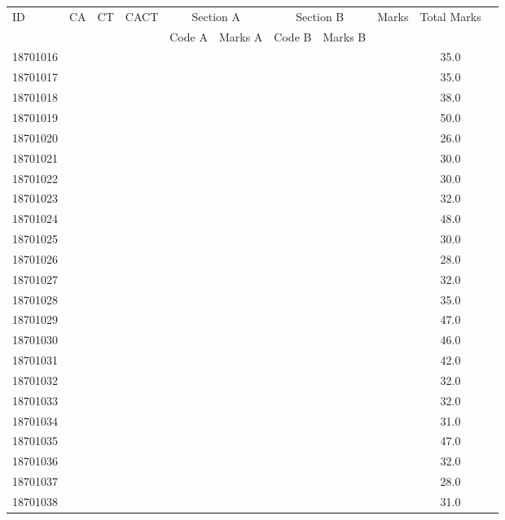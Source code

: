 \documentclass[12pt]{article}
\begin{document}
    \begin{center} 
	\renewcommand{\arraystretch}{1.08}
	\begin{small}
    \begin{tabular}{|l|c|c|c|c|c|c|c|c|c|c|} \hline
	\multirow{2}{*}{ID} & 	\multirow{2}{*}{CA}  & 	\multirow{2}{*}{CT}  & 	\multirow{2}{*}{CACT}  & \multicolumn{2 }{c|}{Section A}& \multicolumn{2 }{c|}{Section B} & 	\multirow{2}{*}{Marks}  & 	\multirow{2}{*}{Total Marks}  \\ 
	&  &  &  & Code A & Marks A & Code B & Marks B&  &  \\ \hline
18701016 &  &  &  &  &  &  &  &  & 35.0\\ \hline 
18701017 &  &  &  &  &  &  &  &  & 35.0\\ \hline 
18701018 &  &  &  &  &  &  &  &  & 38.0\\ \hline 
18701019 &  &  &  &  &  &  &  &  & 50.0\\ \hline 
18701020 &  &  &  &  &  &  &  &  & 26.0\\ \hline 
18701021 &  &  &  &  &  &  &  &  & 30.0\\ \hline 
18701022 &  &  &  &  &  &  &  &  & 30.0\\ \hline 
18701023 &  &  &  &  &  &  &  &  & 32.0\\ \hline 
18701024 &  &  &  &  &  &  &  &  & 48.0\\ \hline 
18701025 &  &  &  &  &  &  &  &  & 30.0\\ \hline 
18701026 &  &  &  &  &  &  &  &  & 28.0\\ \hline 
18701027 &  &  &  &  &  &  &  &  & 32.0\\ \hline 
18701028 &  &  &  &  &  &  &  &  & 35.0\\ \hline 
18701029 &  &  &  &  &  &  &  &  & 47.0\\ \hline 
18701030 &  &  &  &  &  &  &  &  & 46.0\\ \hline 
18701031 &  &  &  &  &  &  &  &  & 42.0\\ \hline 
18701032 &  &  &  &  &  &  &  &  & 32.0\\ \hline 
18701033 &  &  &  &  &  &  &  &  & 32.0\\ \hline 
18701034 &  &  &  &  &  &  &  &  & 31.0\\ \hline 
18701035 &  &  &  &  &  &  &  &  & 47.0\\ \hline 
18701036 &  &  &  &  &  &  &  &  & 32.0\\ \hline 
18701037 &  &  &  &  &  &  &  &  & 28.0\\ \hline 
18701038 &  &  &  &  &  &  &  &  & 31.0\\ \hline 

\end{tabular}
\end{small}
\end{center}
\end{document}
